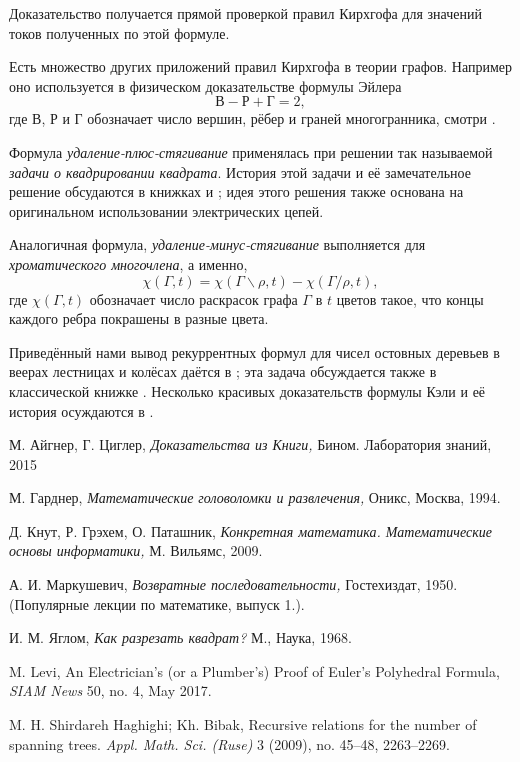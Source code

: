 \documentclass{article}
\begin{document}
Доказательство получается прямой проверкой правил Кирхгофа для значений токов полученных по этой формуле.

Есть множество других приложений правил Кирхгофа в теории графов. 
Например оно используется в физическом доказательстве формулы Эйлера
\[\text{В}-\text{Р}+\text{Г}=2,\]
где $\text{В}$, $\text{Р}$ и $\text{Г}$ обозначает число вершин, рёбер и граней многогранника,
смотри \cite{levi}.

Формула \emph{удаление-плюс-стягивание} применялась при решении так называемой \emph{задачи о квадрировании квадрата}.
История этой задачи и её замечательное решение обсудаются в книжках \cite{yaglom} и \cite[Глава 32]{gardner};
идея этого решения также основана на оригинальном использовании электрических цепей.

Аналогичная формула, \emph{удаление-минус-стягивание} выполняется для \emph{хроматического многочлена}, а именно,
\[\chi(\Gamma,t)=\chi(\Gamma\backslash\rho,t)-\chi(\Gamma/\rho,t),\] 
где $\chi(\Gamma,t)$ обозначает число раскрасок графа $\Gamma$ в $t$ цветов такое, что концы каждого ребра покрашены в разные цвета.

Приведённый нами вывод рекуррентных формул для чисел ос\-тов\-ных деревьев в веерах лестницах и колёсах даётся в \cite{haghighi-bibak};
эта задача обсуждается также в классической книжке \cite{knut}.
Несколько красивых доказательств формулы Кэли и её история осуждаются в \cite[Глава 30]{aigner-ziegler}.

\begin{thebibliography}{52}

 М. Айгнер, Г. Циглер, 
\emph{Доказательства из Книги,} 
Бином. Лаборатория знаний, 2015 

 М. Гарднер, \emph{Математические головоломки и развлечения,}  Оникс, Москва, 1994.

Д. Кнут, Р. Грэхем, О. Паташник,
\emph{Конкретная математика. Математические основы информатики,}
М. Вильямс, 
2009.

А. И. Маркушевич,
\emph{Возвратные последовательности,} 
Гостехиздат, 1950. (Популярные лекции по математике, выпуск 1.).


И. М. Яглом,
\emph{Как разрезать квадрат?}
М., Наука, 1968.

 M. Levi,
An Electrician’s (or a Plumber’s)
Proof of Euler’s Polyhedral Formula,
\emph{SIAM News} 50, no. 4, May 2017.


 M. H. Shirdareh Haghighi; Kh. Bibak, 
Recursive relations for the number of spanning trees. 
\emph{Appl. Math. Sci. (Ruse)} 3 (2009), no. 45--48, 2263--2269. 
\end{thebibliography}
\end{document}
